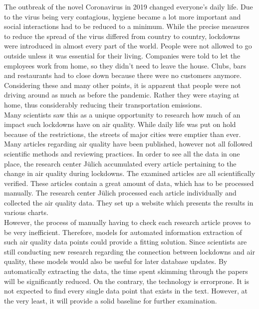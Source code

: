 The outbreak of the novel Coronavirus in 2019 changed everyone's daily life. Due to the virus being very contagious, hygiene became a lot more important and social interactions had to be reduced to a minimum. While the precise measures to reduce the spread of the virus differed from country to country, lockdowns were introduced in almost every part of the world. People were not allowed to go outside unless it was essential for their living. Companies were told to let the employees work from home, so they didn't need to leave the house. Clubs, bars and restaurants had to close down because there were no customers anymore. Considering these and many other points, it is apparent that people were not driving around as much as before the pandemic. Rather they were staying at home, thus considerably reducing their transportation emissions. \\
Many scientists saw this as a unique opportunity to research how much of an impact such lockdowns have on air quality. While daily life was put on hold because of the restrictions, the streets of major cities were emptier than ever. Many articles regarding air quality have been published, however not all followed scientific methods and reviewing practices. In order to see all the data in one place, the research center Jülich accumulated every article pertaining to the change in air quality during lockdowns. The examined articles are all scientifically verified. These articles contain a great amount of data, which has to be processed manually. The research center Jülich processed each article individually and collected the air quality data. They set up a website which presents the results in various charts. \\
However, the process of manually having to check each research article proves to be very inefficient. Therefore, models for automated information extraction of such air quality data points could provide a fitting solution. Since scientists are still conducting new research regarding the connection between lockdowns and air quality, these models would also be useful for later database updates. By automatically extracting the data, the time spent skimming through the papers will be significantly reduced. On the contrary, the technology is errorprone. It is not expected to find every single data point that exists in the text. However, at the very least, it will provide a solid baseline for further examination. 

